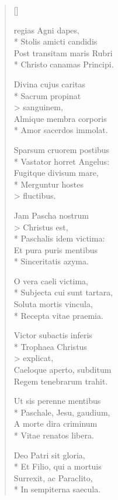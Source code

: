 \newHymn


\begin{multicols}{2}
\begin{verse}[\versewidth]

 regias Agni dapes,\\*
Stolis amicti candidis\\
Post transitam maris Rubri\\*
Christo canamas Principi.\pointtrans

Divina cujus caritas\\*
Sacrum propinat\\> sanguinem,\\
Almique membra corporis\\*
Amor sacerdos immolat.

Sparsum cruorem postibus\\*
Vastator horret Angelus:\\
Fugitque divisum mare,\\*
Merguntur hostes\\> fluctibus.

Jam Pascha nostrum\\> Christus est,\\*
Paschalis idem victima:\\
Et pura puris mentibus\\*
Sinceritatis azyma.

O vera caeli victima,\\*
Subjecta cui sunt tartara,\\
Soluta mortis vincula,\\*
Recepta vitae praemia.

Victor subactis inferis\\*
Trophaea Christus\\> explicat,\\
Caeloque aperto, subditum\\
Regem tenebrarum trahit.

Ut sis perenne mentibus\\*
Paschale, Jesu, gaudium,\\
A morte dira criminum\\*
Vitae renatos libera.


Deo Patri sit gloria,\\*
Et Filio, qui a mortuis\\
Surrexit, ac Paraclito,\\*
In sempiterna saecula.

\end{verse}


\end{multicols}

